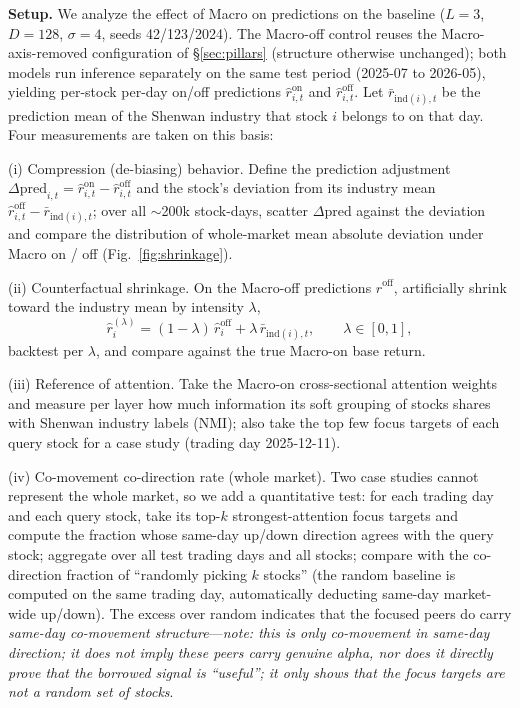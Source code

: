 \documentclass[a4paper,11pt]{article}
\begin{document}
\textbf{Setup.} We analyze the effect of Macro on predictions on the
baseline ($L{=}3$, $D{=}128$, $\sigma{=}4$, seeds 42/123/2024). The Macro-off
control reuses the Macro-axis-removed configuration of \S\ref{sec:pillars}
(structure otherwise unchanged); both models run inference separately on the
same test period (2025-07 to 2026-05), yielding per-stock per-day on/off
predictions $\hat r^{\mathrm{on}}_{i,t}$ and $\hat r^{\mathrm{off}}_{i,t}$. Let
$\bar r_{\mathrm{ind}(i),t}$ be the prediction mean of the Shenwan industry
that stock $i$ belongs to on that day. Four measurements are taken on this
basis:

(i) Compression (de-biasing) behavior. Define the prediction adjustment
$\Delta\text{pred}_{i,t}=\hat r^{\mathrm{on}}_{i,t}-\hat r^{\mathrm{off}}_{i,t}$
and the stock's deviation from its industry mean
$\hat r^{\mathrm{off}}_{i,t}-\bar r_{\mathrm{ind}(i),t}$; over all
$\sim$200k stock-days, scatter $\Delta\text{pred}$ against the deviation and
compare the distribution of whole-market mean absolute deviation under Macro
on / off (Fig.~\ref{fig:shrinkage}).

(ii) Counterfactual shrinkage. On the Macro-off predictions
$\hat r^{\mathrm{off}}$, artificially shrink toward the industry mean by
intensity $\lambda$,
\begin{equation}\label{eq:lambda}
\hat r_i^{(\lambda)} = (1-\lambda)\,\hat r^{\mathrm{off}}_i + \lambda\,\bar r_{\mathrm{ind}(i),t},\qquad \lambda\in[0,1],
\end{equation}
backtest per $\lambda$, and compare against the true Macro-on base return.

(iii) Reference of attention. Take the Macro-on cross-sectional attention
weights and measure per layer how much information its soft grouping of stocks
shares with Shenwan industry labels (NMI); also take the top few focus targets
of each query stock for a case study (trading day 2025-12-11).

(iv) Co-movement co-direction rate (whole market). Two case studies cannot
represent the whole market, so we add a quantitative test: for each trading day
and each query stock, take its top-$k$ strongest-attention focus targets and
compute the fraction whose same-day up/down direction agrees with the query
stock; aggregate over all test trading days and all stocks; compare with the
co-direction fraction of ``randomly picking $k$ stocks'' (the random baseline
is computed on the same trading day, automatically deducting same-day
market-wide up/down). The excess over random indicates that the focused peers
do carry \emph{same-day co-movement structure}---\emph{note: this is only
co-movement in same-day direction; it does not imply these peers carry genuine
alpha, nor does it directly prove that the borrowed signal is ``useful''; it
only shows that the focus targets are not a random set of stocks}.
\end{document}
